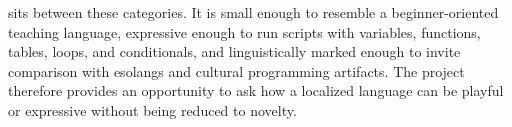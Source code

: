 \plat{} sits between these categories. It is small enough to resemble a
beginner-oriented teaching language, expressive enough to run scripts with
variables, functions, tables, loops, and conditionals, and linguistically
marked enough to invite comparison with esolangs and cultural programming
artifacts. The project therefore provides an opportunity to ask how a localized
language can be playful or expressive without being reduced to novelty.

